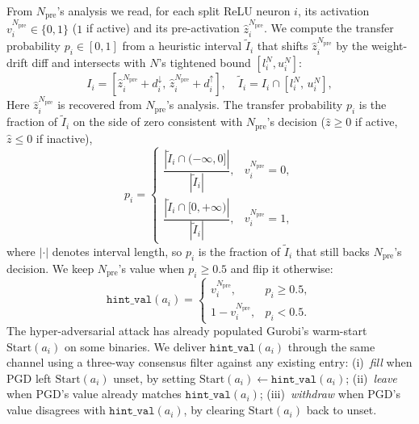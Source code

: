 \documentclass[11pt]{article}
\begin{document}
From $N_\text{pre}$'s analysis we read, for each split ReLU neuron $i$, its activation
$v^{N_\text{pre}}_i \in \{0,1\}$ ($1$ if active) and its pre-activation $\hat z^{N_\text{pre}}_i$.
We compute the transfer probability $p_i \in [0, 1]$ from a heuristic interval $\tilde I_i$ that
shifts $\hat z^{N_\text{pre}}_i$ by the weight-drift diff and intersects with $N$'s tightened
bound $[l^N_i, u^N_i]$:
\begin{equation}
  I_i = [\hat z^{N_\text{pre}}_i + d^\downarrow_i,\, \hat z^{N_\text{pre}}_i + d^\uparrow_i],
  \quad
  \tilde I_i = I_i \cap [l^{N}_i,\, u^{N}_i],
  \label{eq:vh_interval}
\end{equation}
Here $\hat z^{N_\text{pre}}_i$ is recovered from $N_\text{pre}$'s analysis. 
The transfer probability $p_i$ is the fraction of $\tilde I_i$ on the side of zero consistent with $N_\text{pre}$'s decision ($\hat z \ge 0$ if active, $\hat z \le 0$ if inactive),
\begin{equation}
  p_i = \begin{cases}
    \dfrac{|\tilde I_i \cap (-\infty, 0]|}{|\tilde I_i|}, & v^{N_\text{pre}}_i = 0, \\[8pt]
    \dfrac{|\tilde I_i \cap [0, +\infty)|}{|\tilde I_i|}, & v^{N_\text{pre}}_i = 1,
  \end{cases}
  \label{eq:vh_p}
\end{equation}
where $|\cdot|$ denotes interval length, so $p_i$ is the fraction of $\tilde I_i$ that still backs $N_\text{pre}$'s decision. We keep $N_\text{pre}$'s value when $p_i \ge 0.5$ and flip it otherwise:
\begin{equation}
  \mathtt{hint\_val}(a_i) =
    \begin{cases}
      v^{N_\text{pre}}_i, & p_i \ge 0.5, \\
      1 - v^{N_\text{pre}}_i, & p_i < 0.5.
    \end{cases}
  \label{eq:vh_val}
\end{equation}
The hyper-adversarial attack has already populated Gurobi's warm-start $\mathrm{Start}(a_i)$ on some 
binaries. We deliver $\mathtt{hint\_val}(a_i)$ through the same channel using a 
three-way consensus filter against any existing entry: 
(i)~\emph{fill} when PGD left $\mathrm{Start}(a_i)$ unset, by setting $\mathrm{Start}(a_i) 
\leftarrow \mathtt{hint\_val}(a_i)$; (ii)~\emph{leave} when PGD's value already matches 
$\mathtt{hint\_val}(a_i)$; (iii)~\emph{withdraw} when PGD's value disagrees with 
$\mathtt{hint\_val}(a_i)$, by clearing $\mathrm{Start}(a_i)$ back to unset.
\end{document}
